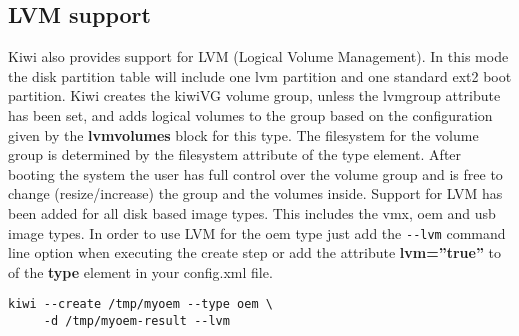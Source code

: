 
\subsection{LVM support}

Kiwi also provides support for LVM (Logical Volume Management). In this
mode the disk partition table will include one lvm partition and one
standard ext2 boot partition. Kiwi creates the kiwiVG volume group, unless
the lvmgroup attribute has been set, and adds logical volumes to the group
based on the configuration given by the \textbf{lvmvolumes} block
for this type. The filesystem for the volume group is determined by the
filesystem attribute of the type element. After booting the system the user
has full control over the volume group and is free to change
(resize/increase) the group and the volumes inside. Support for LVM has
been added for all disk based image types. This includes the vmx, oem and
usb image types. In order to use LVM for the oem type just add the 
\verb+--lvm+ command line option when executing the create step or add
the attribute \textbf{lvm=''true''} to of the \textbf{type} 
element in your config.xml file.

\begin{Command}{12cm}
\begin{verbatim}
kiwi --create /tmp/myoem --type oem \
     -d /tmp/myoem-result --lvm
\end{verbatim}
\end{Command}

